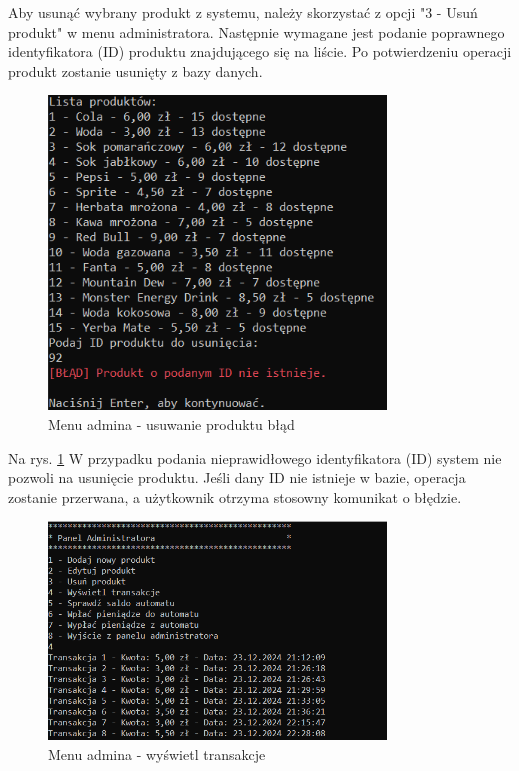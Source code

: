 Aby usunąć wybrany produkt z systemu, należy skorzystać z opcji "3 - Usuń produkt" w menu administratora. Następnie wymagane jest podanie poprawnego identyfikatora (ID) produktu znajdującego się na liście. Po potwierdzeniu operacji produkt zostanie usunięty z bazy danych.

\newpage

\begin{figure}[H] 
    \centering
    \includegraphics[width=0.8\textwidth]{grafiki/blad_id_usun.png}
    \caption{\footnotesize Menu admina - usuwanie produktu błąd}	
    \label{fig:5.16}
\end{figure}

Na rys. \ref{fig:5.16} W przypadku podania nieprawidłowego identyfikatora (ID) system nie pozwoli na usunięcie produktu. Jeśli dany ID nie istnieje w bazie, operacja zostanie przerwana, a użytkownik otrzyma stosowny komunikat o błędzie.

\newpage

\begin{figure}[H] 
    \centering
    \includegraphics[width=0.8\textwidth]{grafiki/wyswietl_transakcje.png}
    \caption{\footnotesize Menu admina - wyświetl transakcje}	
    \label{fig:5.17}
\end{figure}

